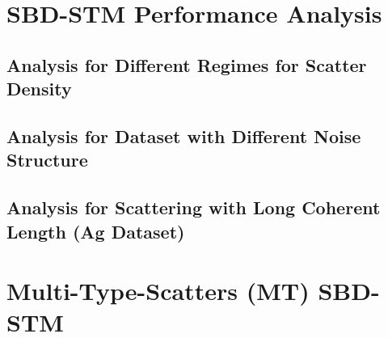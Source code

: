 \section{SBD-STM Performance Analysis}
\subsection{Analysis for Different Regimes for Scatter Density}
\subsection{Analysis for Dataset with Different Noise Structure}
\subsection{Analysis for Scattering with Long Coherent Length (Ag Dataset)}
\section{Multi-Type-Scatters (MT) SBD-STM}